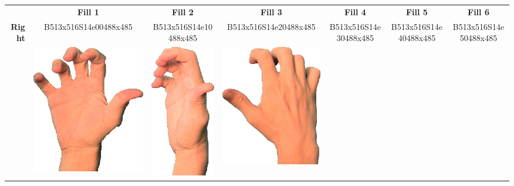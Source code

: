 \documentclass{article}
\begin{document}
\begin{center}
\begin{tabular}{r*{6}{c}}
&\textbf{Fill 1}&\textbf{Fill 2}&\textbf{Fill 3}&\textbf{Fill 4}&\textbf{Fill 5}&\textbf{Fill 6}\\
\multirow{2}{*}{\textbf{Right}}&
B513x516S14e00488x485&
B513x516S14e10488x485&
B513x516S14e20488x485&
B513x516S14e30488x485&
B513x516S14e40488x485&
B513x516S14e50488x485\\
&
\includegraphics[scale=0.1]{images/05-03-1.jpg}&
\includegraphics[scale=0.1]{images/05-03-2.jpg}&
\includegraphics[scale=0.1]{images/05-03-3.jpg}&

\end{tabular}
\end{center}
\end{document}
